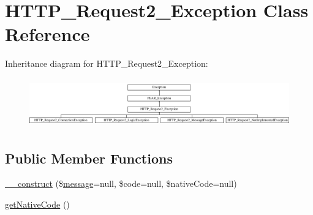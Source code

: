\hypertarget{classHTTP__Request2__Exception}{\section{H\-T\-T\-P\-\_\-\-Request2\-\_\-\-Exception Class Reference}
\label{classHTTP__Request2__Exception}
}
Inheritance diagram for H\-T\-T\-P\-\_\-\-Request2\-\_\-\-Exception\-:\begin{figure}[H]
\begin{center}
\leavevmode
\includegraphics[height=2.162162cm]{classHTTP__Request2__Exception}
\end{center}
\end{figure}
\subsection*{Public Member Functions}
\begin{DoxyCompactItemize}
\item 
\hyperlink{classHTTP__Request2__Exception_a47da8c63916bdd299dc2c23b03f01bed}{\-\_\-\-\_\-construct} (\$\hyperlink{classmessage}{message}=null, \$code=null, \$native\-Code=null)
\item 
\hyperlink{classHTTP__Request2__Exception_a9d09eee1bf0232f394fd9f842c939d45}{get\-Native\-Code} ()
\end{DoxyCompactItemize}
